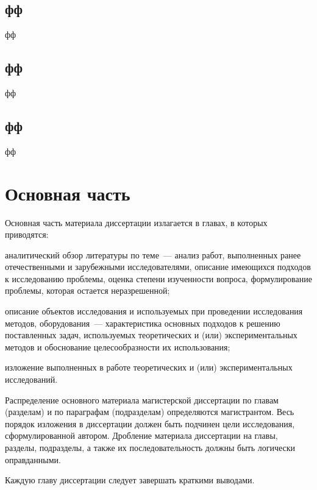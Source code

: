 \section{фф}

фф

\section{фф}

фф

\section{фф}

фф

\chapter{Основная часть}
Основная часть материала диссертации излагается в главах, в которых приводятся:

аналитический обзор литературы по теме~--– анализ работ, выполненных ранее отечественными и зарубежными исследователями, описание имеющихся подходов к исследованию проблемы, оценка степени изученности вопроса, формулирование проблемы, которая остается неразрешенной;

описание объектов исследования и используемых при проведении исследования методов, оборудования~--- характеристика основных подходов к решению поставленных задач, используемых теоретических и (или) экспериментальных методов и обоснование целесообразности их использования;

изложение выполненных в работе теоретических и (или) экспериментальных исследований.

Распределение основного материала магистерской диссертации по главам (разделам) и по параграфам (подразделам) определяются магистрантом. Весь порядок изложения в диссертации должен быть подчинен цели исследования, сформулированной автором. Дробление материала диссертации на главы, разделы, подразделы, а также их последовательность должны быть логически оправданными.

Каждую главу диссертации следует завершать краткими выводами.